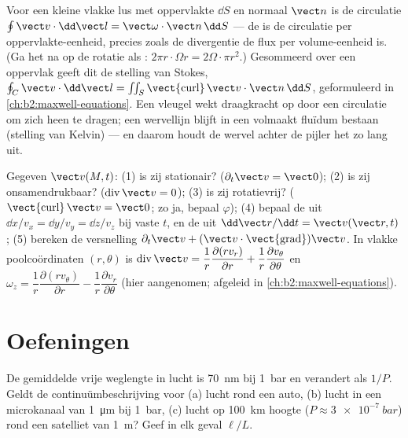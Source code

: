 \begin{remark}\label{rem:b2:fluid-kinematics:stokes}
Voor een kleine vlakke lus met oppervlakte $\dd S$ en normaal $\vect n$ is
de circulatie $\oint\vect v\cdot\dd\vect l = \vect\omega\cdot\vect n\,\dd S$
--- de  is de circulatie per oppervlakte-eenheid, precies zoals
de divergentie de flux per volume-eenheid is. (Ga het na op de rotatie als
: $2\pi r\cdot\Omega r = 2\Omega\cdot\pi r^2$.) Gesommeerd over
een oppervlak geeft dit de stelling van Stokes,
$\oint_C\vect v\cdot\dd\vect l = \iint_S
\operatorname{\vect{curl}}\vect v\cdot\vect n\,\dd S$,
geformuleerd in \cref{ch:b2:maxwell-equations}. Een vleugel wekt draagkracht
op door een circulatie om zich heen te dragen; een wervellijn blijft in een
volmaakt fluïdum bestaan (stelling van Kelvin) --- en daarom houdt de wervel
achter de pijler het zo lang uit.
\end{remark}

\begin{method}\label{met:b2:fluid-kinematics:reading}
Gegeven $\vect v(M, t)$: (1) is zij stationair?
($\partial_t\vect v = \vect 0$); (2) is zij onsamendrukbaar?
($\operatorname{div}\vect v = 0$); (3) is zij rotatievrij?
($\operatorname{\vect{curl}}\vect v = \vect 0$; zo ja, bepaal $\varphi$);
(4) bepaal de  uit $\dd x/v_x = \dd y/v_y = \dd z/
v_z$ bij
vaste $t$, en de  uit $\dd\vect r/\dd t = \vect v(\vect r,
t)$;
(5) bereken de versnelling
$\partial_t\vect v + (\vect v\cdot
\operatorname{\vect{grad}})\vect v$. In
vlakke poolcoördinaten $(r, \theta)$ is
$\operatorname{div}\vect v = \dfrac1r\dfrac{\partial(rv_r)}{\partial r} + \dfrac1r
\dfrac{\partial v_\theta}{\partial\theta}$
en
$\omega_z = \dfrac1r\dfrac{\partial(rv_\theta)}
{\partial r} - \dfrac1r\dfrac{\partial v_r}{\partial\theta}$
(hier aangenomen; afgeleid in \cref{ch:b2:maxwell-equations}).
\end{method}

\section{Oefeningen}

\begin{exercise}[$\star$]\label{exo:b2:fluid-kinematics:1}
De gemiddelde vrije weglengte in lucht is \qty{70}{nm} bij \qty{1}{bar} en
verandert als $1/P$. Geldt de continuümbeschrijving voor (a) lucht rond een
auto, (b) lucht in een microkanaal van \qty{1}{\micro m} bij \qty{1}{bar},
(c) lucht op \qty{100}{km} hoogte ($P \approx \qty{3e-7}{bar}$) rond een
satelliet van \qty{1}{m}? Geef in elk geval $\ell/L$.
\end{exercise}

